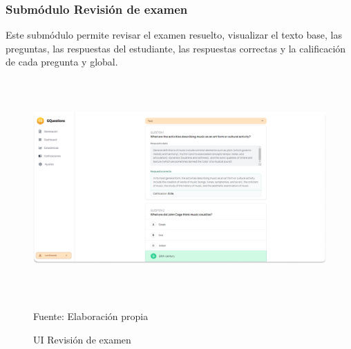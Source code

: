 \documentclass[../Main.tex]{subfiles}
\begin{document}
    \subsubsection{Submódulo Revisión de examen}
    \begin{justify}
    Este submódulo permite revisar el examen resuelto, visualizar el texto base, las preguntas, las respuestas del estudiante, las respuestas correctas y la calificación de cada pregunta y global.
    \end{justify}

    \begin{figure}[H]
	\begin{Center}
		\includegraphics[width=6.4in,height=3.3in]{Images/ui_revision_examen.png}
	    \caption{UI Revisión de examen}
	    Fuente: Elaboración propia
        \label{fig:section}
	\end{Center}
    \end{figure}
    
\end{document}
